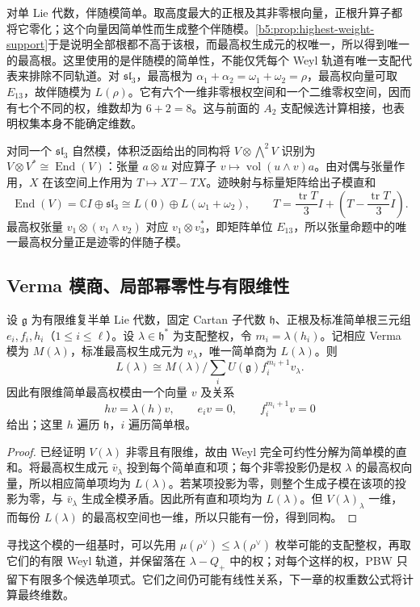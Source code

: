 \ProseParagraphBreak
对单 Lie 代数，伴随模简单。取高度最大的正根及其非零根向量，正根升算子都将它零化；这个向量因简单性而生成整个伴随模。\cref{b5:prop:highest-weight-support}于是说明全部根都不高于该根，而最高权生成元的权唯一，所以得到唯一的最高根。这里使用的是伴随模的简单性，不能仅凭每个 Weyl 轨道有唯一支配代表来排除不同轨道。对 \(\mathfrak{sl}_3\)，最高根为 \(\alpha_1+\alpha_2=\omega_1+\omega_2=\rho\)，最高权向量可取 \(E_{13}\)，故伴随模为 \(L(\rho)\)。它有六个一维非零根权空间和一个二维零权空间，因而有七个不同的权，维数却为 \(6+2=8\)。这与前面的 \(A_2\) 支配候选计算相接，也表明权集本身不能确定维数。

\ProseParagraphBreak
对同一个 \(\mathfrak{sl}_3\) 自然模，体积泛函给出的同构将 \(V\otimes\bigwedge^2V\) 识别为 \(V\otimes V^*\cong\operatorname{End}(V)\)：张量 \(a\otimes u\) 对应算子 \(v\mapsto\operatorname{vol}(u\wedge v)a\)。由对偶与张量作用，\(X\) 在该空间上作用为 \(T\mapsto XT-TX\)。迹映射与标量矩阵给出子模直和
\[
	\operatorname{End}(V)=\mathbb CI\oplus\mathfrak{sl}_3 \cong L(0)\oplus L(\omega_1+\omega_2), \qquad T=\dfrac{\operatorname{tr}T}{3}I+ \left(T-\dfrac{\operatorname{tr}T}{3}I\right).
\]
最高权张量 \(v_1\otimes(v_1\wedge v_2)\) 对应 \(v_1\otimes v_3^*\)，即矩阵单位 \(E_{13}\)，所以张量命题中的唯一最高权分量正是迹零的伴随子模。

\subsection{Verma 模商、局部幂零性与有限维性}
\label{b5:subsec:1804:04}

\begin{proposition}\label{b5:prop:finite-highest-presentation}
	设 \(\mathfrak g\) 为有限维复半单 Lie 代数，固定 Cartan 子代数 \(\mathfrak h\)、正根及标准简单根三元组 \(e_i,f_i,h_i\)（\(1\le i\le\ell\)）。设 \(\lambda\in\mathfrak h^*\) 为支配整权，令 \(m_i=\lambda(h_i)\)。记相应 Verma 模为 \(M(\lambda)\)，标准最高权生成元为 \(v_\lambda\)，唯一简单商为 \(L(\lambda)\)。则
	\[
		L(\lambda)\cong M(\lambda)\Big/\sum_i U(\mathfrak g)f_i^{m_i+1}v_\lambda.
	\]
	因此有限维简单最高权模由一个向量 \(v\) 及关系
	\[
		hv=\lambda(h)v,\qquad e_iv=0,\qquad f_i^{m_i+1}v=0
	\]
	给出；这里 \(h\) 遍历 \(\mathfrak h\)，\(i\) 遍历简单根。
\end{proposition}
\begin{proof}
	已经证明 \(V(\lambda)\) 非零且有限维，故由 Weyl 完全可约性分解为简单模的直和。将最高权生成元 \(\bar v_\lambda\) 投到每个简单直和项；每个非零投影仍是权 \(\lambda\) 的最高权向量，所以相应简单项均为 \(L(\lambda)\)。若某项投影为零，则整个生成子模在该项的投影为零，与 \(\bar v_\lambda\) 生成全模矛盾。因此所有直和项均为 \(L(\lambda)\)。但 \(V(\lambda)_\lambda\) 一维，而每份 \(L(\lambda)\) 的最高权空间也一维，所以只能有一份，得到同构。
\end{proof}

寻找这个模的一组基时，可以先用 \(\mu(\rho^\vee)\le\lambda(\rho^\vee)\) 枚举可能的支配整权，再取它们的有限 Weyl 轨道，并保留落在 \(\lambda-Q_+\) 中的权；对每个这样的权，PBW 只留下有限多个候选单项式。它们之间仍可能有线性关系，下一章的权重数公式将计算最终维数。
